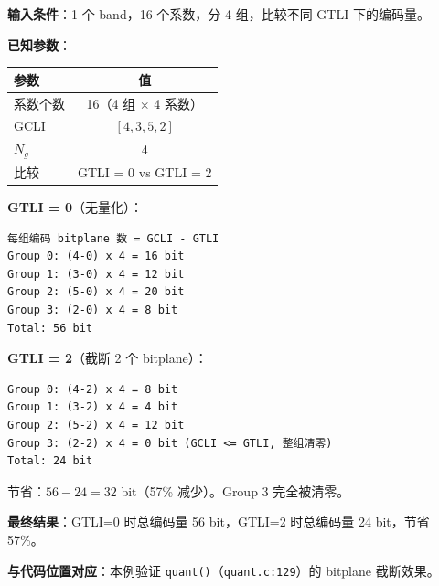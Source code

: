 \begin{examplebox}[title={例 5：GTLI 对编码量的影响}]

\textbf{输入条件}：1 个 band，16 个系数，分 4 组，比较不同 GTLI 下的编码量。

\medskip
\textbf{已知参数}：

\begin{tabular}{@{}lc@{}}
\toprule
参数 & 值 \\
\midrule
系数个数 & 16（4 组 $\times$ 4 系数） \\
GCLI & $[4, 3, 5, 2]$ \\
$N_g$ & 4 \\
比较 & GTLI = 0 vs GTLI = 2 \\
\bottomrule
\end{tabular}

\medskip
\textbf{GTLI = 0}（无量化）：

\begin{lstlisting}[numbers=none]
每组编码 bitplane 数 = GCLI - GTLI
Group 0: (4-0) x 4 = 16 bit
Group 1: (3-0) x 4 = 12 bit
Group 2: (5-0) x 4 = 20 bit
Group 3: (2-0) x 4 = 8 bit
Total: 56 bit
\end{lstlisting}

\textbf{GTLI = 2}（截断 2 个 bitplane）：

\begin{lstlisting}[numbers=none]
Group 0: (4-2) x 4 = 8 bit
Group 1: (3-2) x 4 = 4 bit
Group 2: (5-2) x 4 = 12 bit
Group 3: (2-2) x 4 = 0 bit (GCLI <= GTLI, 整组清零)
Total: 24 bit
\end{lstlisting}

节省：$56 - 24 = 32$ bit（57\% 减少）。Group 3 完全被清零。

\medskip
\textbf{最终结果}：GTLI=0 时总编码量 56 bit，GTLI=2 时总编码量 24 bit，节省 57\%。

\medskip
\textbf{与代码位置对应}：本例验证 \texttt{quant()}（\texttt{quant.c:129}）的 bitplane 截断效果。
\end{examplebox}
